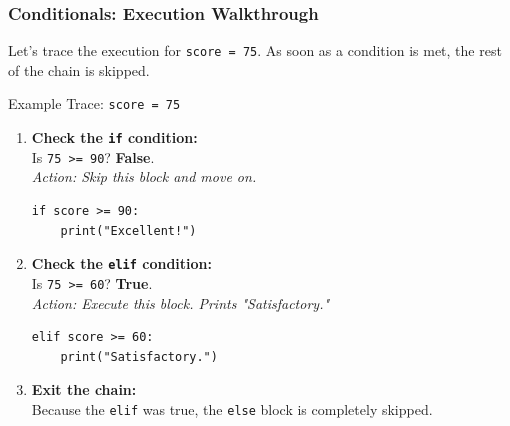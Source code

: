 \documentclass{beamer}
\begin{document}
\begin{frame}[fragile]
    \frametitle{Conditionals: Execution Walkthrough}
    Let's trace the execution for \texttt{score = 75}. As soon as a condition is met, the rest of the chain is skipped.

    \begin{block}{Example Trace: \texttt{score = 75}}
        \begin{enumerate}
            \item \textbf{Check the \texttt{if} condition:} \\
            Is \texttt{75 >= 90}? \hfill \textbf{False}. \\
            \textit{Action: Skip this block and move on.}
            \begin{verbatim}
if score >= 90:
    print("Excellent!")
            \end{verbatim}
            
            \item \textbf{Check the \texttt{elif} condition:} \\
            Is \texttt{75 >= 60}? \hfill \textbf{True}. \\
            \textit{Action: Execute this block. Prints "Satisfactory."}
            \begin{verbatim}
elif score >= 60:
    print("Satisfactory.")
            \end{verbatim}
            
            \item \textbf{Exit the chain:} \\
            Because the \texttt{elif} was true, the \texttt{else} block is completely skipped.
        \end{enumerate}
    \end{block}
\end{frame}
\end{document}
